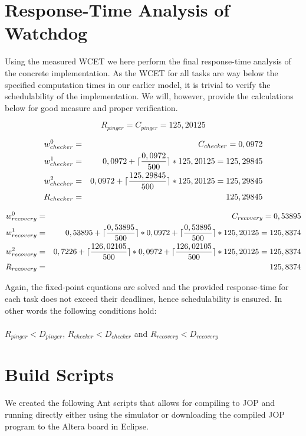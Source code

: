 \section{Response-Time Analysis of Watchdog} %
\label{sec:response_time_analysis_of_watchdog}
Using the measured WCET we here perform the final response-time analysis of the concrete implementation. As the WCET for all tasks are way below the specified computation times in our earlier model, it is trivial to verify the schedulability of the implementation. We will, however, provide the calculations below for good measure and proper verification.

\begin{equation}
\label{eq:pingerrta}
     R_{pinger} = C_{pinger} = 125,20125
\end{equation}

\begin{eqnarray}
    w_{checker}^0 &=& C_{checker} = 0,0972 \nonumber \\ 
    w_{checker}^1 &=& 0,0972 + \lceil\frac{0,0972}{500}\rceil*125,20125 = 125,29845 \nonumber \\ 
    w_{checker}^2 &=& 0,0972 + \lceil\frac{125,29845}{500}\rceil*125,20125 = 125,29845 \nonumber \\
    R_{checker} &=& 125,29845
\end{eqnarray}

\begin{eqnarray}
    w_{recovery}^0 &=& C_{recovery} = 0,53895 \nonumber \\ 
    w_{recovery}^1 &=& 0,53895 + \lceil\frac{0,53895}{500}\rceil*0,0972 + \lceil\frac{0,53895}{500}\rceil*125,20125 = 125,8374 \nonumber \\ 
    w_{recovery}^2 &=& 0,7226 + \lceil\frac{126,02105}{500}\rceil*0,0972 + \lceil\frac{126,02105}{500}\rceil*125,20125 = 125,8374 \nonumber \\
    R_{recovery} &=& 125,8374
\end{eqnarray}

Again, the fixed-point equations are solved and the provided response-time for each task does not exceed their deadlines, hence schedulability is ensured. In other words the following conditions hold: \\\\
$R_{pinger} < D_{pinger}$, $R_{checker} < D_{checker}$ and $R_{recovery} < D_{recovery}$



\section{Build Scripts} %
\label{cha:build_scripts}
We created the following Ant scripts that allows for compiling to JOP and running directly either using the simulator or downloading the compiled JOP program to the Altera board in Eclipse.




